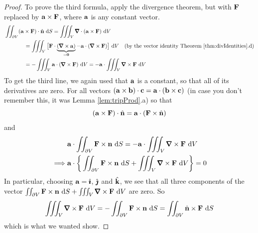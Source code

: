 \begin{proof}
\medskip
\noindent
To prove the third formula, apply the divergence theorem, but with
$\mathbf{F}$ replaced by $\mathbf{a}\times\mathbf{F}$, where $\mathbf{a}$ is any constant vector.
\begin{align*}
&\dblInt_{\partial V} (\va\times\vF)\cdot\hn\ \dee{S}
=\tripInt_V\vnabla\cdot(\va\times\vF)\ \dee{V} \\
&\hskip0.5in=\tripInt_V\big[\vF\cdot\underbrace{(\vnabla \times \va)}_{=\vZero}
  -\va\cdot(\vnabla\times\vF)\big]\ \dee{V} 
\quad \text{(by the vector identity Theorem \ref{thm:divIdentities}.d)} \\
&\hskip0.5in=-\tripInt_V\va\cdot(\vnabla \times\vF)\ \dee{V}
=-\va\cdot\tripInt_V\vnabla \times\vF\ \dee{V}
\end{align*}
To get the third line, we again used that $\mathbf{a}$ is a constant, so that
all of its derivatives are zero. For all vectors 
$(\mathbf{a}\times\mathbf{b})\cdot\mathbf{c}=\mathbf{a}\cdot(\mathbf{b}\times\mathbf{c})$ (in case you don't
remember this, it was Lemma \ref{lem:tripProd}.a) so that
\begin{equation*}
(\mathbf{a}\times\mathbf{F})\cdot\hat{\mathbf{n}}
=\mathbf{a}\cdot(\mathbf{F}\times\hat{\mathbf{n}})
\end{equation*}
and
\begin{align*}
&\va\cdot\dblInt_{\partial V} \vF\times\vn\ \dee{S}
=-\va\cdot\tripInt_V\vnabla \times\vF\ \dee{V} \\
\implies &\va\cdot\bigg\{\dblInt_{\partial V} \vF\times\vn\ \dee{S}
+\tripInt_V\vnabla\times\vF\ \dee{V}\bigg\}=0
\end{align*}
In particular, choosing $\mathbf{a}=\hat{\pmb{\imath}}$, $\hat{\pmb{\jmath}}$ and $\hat{\mathbf{k}}$, we see that
all three components of the vector $\dblInt_{\partial V} \vF\times\vn\ \dee{S}
+\tripInt_V\vnabla\times\vF\ \dee{V}$ are zero. So 
\begin{equation*}
\tripInt_V\vnabla\times\vF\ \dee{V}
=-\dblInt_{\partial V} \vF\times\vn\ \dee{S}
=\dblInt_{\partial V} \hn\times\vF\ \dee{S}
\end{equation*}
which is what we wanted show.

\end{proof}
